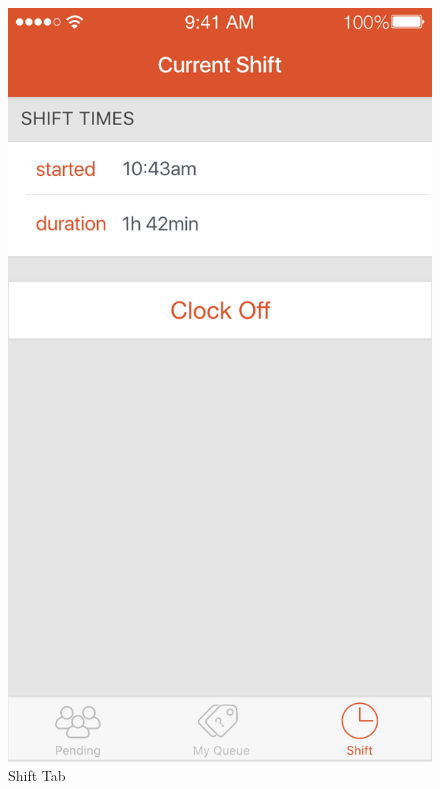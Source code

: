 \documentclass[a4paper,12pt]{article}
\begin{document}
\begin{figure}[p]
\centering
\includegraphics[scale=0.5]{5fe79d1e6c.png}
\caption{Shift Tab}
\label{16}
\end{figure}
\end{document}
